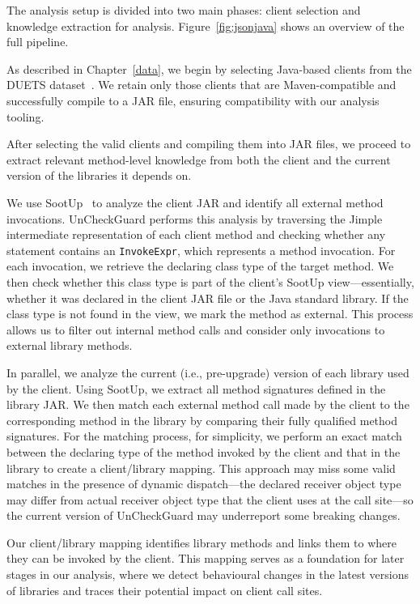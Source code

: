 The analysis setup is divided into two main phases: client selection and knowledge extraction for analysis. Figure~\ref{fig:jsonjava} shows an overview of the full pipeline.

As described in Chapter~\ref{data}, we begin by selecting Java-based clients from the DUETS dataset~\cite{durieux21:_duets}. We retain only those clients that are Maven-compatible and successfully compile to a JAR file, ensuring compatibility with our analysis tooling.

After selecting the valid clients and compiling them into JAR files, we proceed to extract relevant method-level knowledge from both the client and the current version of the libraries it depends on.

We use SootUp~\cite{Karakaya24:_SootUp} to analyze the client JAR and identify all external method invocations. UnCheckGuard performs this analysis by traversing the Jimple intermediate representation of each client method and checking whether any statement contains an \texttt{InvokeExpr}, which represents a method invocation. For each invocation, we retrieve the declaring class type of the target method. We then check whether this class type is part of the client’s SootUp view---essentially, whether it was declared in the client JAR file or the Java standard library. If the class type is not found in the view, we mark the method as external. This process allows us to filter out internal method calls and consider only invocations to external library methods.

In parallel, we analyze the current (i.e., pre-upgrade) version of each library used by the client. Using SootUp, we extract all method signatures defined in the library JAR. We then match each external method call made by the client to the corresponding method in the library by comparing their fully qualified method signatures. For the matching process, for simplicity, we perform an exact match between the declaring type of the method invoked by the client and that in the library to create a client/library mapping. This approach may miss some valid matches in the presence of dynamic dispatch---the declared receiver object type may differ from actual receiver object type that the client uses at the call site---so the current version of UnCheckGuard may underreport some breaking changes.

Our client/library mapping identifies library methods and links them to where they can be invoked by the client. This mapping serves as a foundation for later stages in our analysis, where we detect behavioural changes in the latest versions of libraries and traces their potential impact on client call sites.

